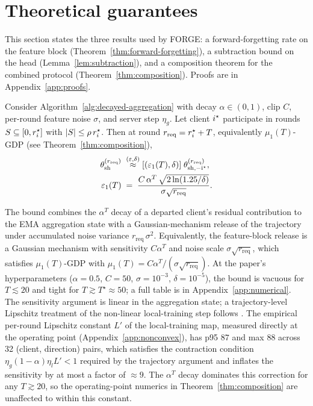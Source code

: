 \section{Theoretical guarantees}
\label{sec:theory}

This section states the three results used by FORGE: a forward-forgetting rate on the
feature block (Theorem~\ref{thm:forward-forgetting}), a subtraction bound on the head
(Lemma~\ref{lem:subtraction}), and a composition theorem for the combined protocol
(Theorem~\ref{thm:composition}). Proofs are in Appendix~\ref{app:proofs}.

\begin{theorem}
\label{thm:forward-forgetting}
Consider Algorithm~\ref{alg:decayed-aggregation} with decay $\alpha \in (0,1)$, clip
$C$, per-round feature noise $\sigma$, and server step $\eta_g$. Let client $i^{\star}$
participate in rounds $S \subseteq [0, r_i^{\star}]$ with $|S| \le \rho \, r_i^{\star}$.
Then at round $r_\mathrm{req} = r_i^{\star} + T$, equivalently $\mu_1(T)$-GDP (see
Theorem~\ref{thm:composition}),
\begin{align}
\theta^{(r_\mathrm{req})}_\mathrm{sh}
 &\;\stackrel{(\varepsilon,\delta)}{\approx}[(\varepsilon_1(T), \delta)]\;
\theta^{(r_\mathrm{req})}_\mathrm{sh,-i^{\star}}, \nonumber \\
\varepsilon_1(T) &\;=\;
\frac{C\,\alpha^T\,\sqrt{2\ln(1.25/\delta)}}{\sigma \sqrt{r_\mathrm{req}}}.
\label{eq:eps-rate}
\end{align}
\end{theorem}

The bound combines the $\alpha^T$ decay of a departed client's residual contribution to
the EMA aggregation state with a Gaussian-mechanism release of the trajectory under
accumulated noise variance $r_\mathrm{req}\,\sigma^2$. Equivalently, the feature-block
release is a Gaussian mechanism with sensitivity $C\alpha^T$ and noise scale
$\sigma \sqrt{r_\mathrm{req}}$, which satisfies $\mu_1(T)$-GDP
\cite{dong2019gaussian} with $\mu_1(T) = C \alpha^T / (\sigma \sqrt{r_\mathrm{req}})$.
At the paper's hyperparameters ($\alpha{=}0.5$, $C{=}50$, $\sigma{=}10^{-3}$,
$\delta{=}10^{-5}$), the bound is vacuous for $T \lesssim 20$ and tight for
$T \gtrsim T^\star \approx 50$; a full table is in Appendix~\ref{app:numerical}. The
sensitivity argument is linear in the aggregation state; a trajectory-level Lipschitz
treatment of the non-linear local-training step follows \cite{neel2021descent,
gupta2021adaptive}. The empirical per-round Lipschitz constant $L'$ of the
local-training map, measured directly at the operating point
(Appendix~\ref{app:nonconvex}), has p95 $87$ and max $88$ across 32 (client,
direction) pairs, which satisfies the contraction condition
$\eta_g (1-\alpha) \eta_l L' < 1$ required by the trajectory argument and inflates
the sensitivity by at most a factor of $\approx 9$. The $\alpha^T$ decay dominates
this correction for any $T \gtrsim 20$, so the operating-point numerics in
Theorem~\ref{thm:composition} are unaffected to within this constant.

